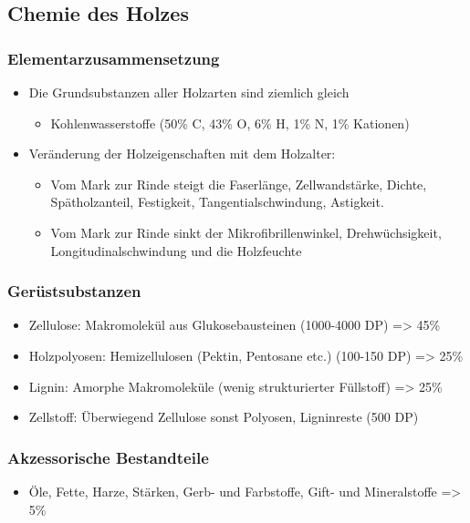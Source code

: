 \documentclass{article}
\begin{document}
\subsection{Chemie des Holzes}
\subsubsection{Elementarzusammensetzung}
\begin{itemize}
  \item Die Grundsubstanzen aller Holzarten sind ziemlich gleich 
  \begin{itemize}
    \item Kohlenwasserstoffe (50\% C, 43\% O, 6\% H, 1\% N, 1\% Kationen)
  \end{itemize}
  \item Veränderung der Holzeigenschaften mit dem Holzalter:
  \begin{itemize}
    \item Vom Mark zur Rinde steigt die Faserlänge, Zellwandstärke, 
    Dichte, Spätholzanteil, Festigkeit, Tangentialschwindung, 
    Astigkeit.
    \item Vom Mark zur Rinde sinkt der Mikrofibrillenwinkel, 
    Drehwüchsigkeit, Longitudinalschwindung und die Holzfeuchte
    \end{itemize}
\end{itemize}



\subsubsection{Gerüstsubstanzen}
\begin{itemize}
  \item Zellulose: Makromolekül aus Glukosebausteinen (1000-4000 DP) => 45\%
  \item Holzpolyosen: Hemizellulosen (Pektin, Pentosane etc.) (100-150 DP) =>
  25\%
  \item Lignin: Amorphe Makromoleküle (wenig strukturierter Füllstoff) => 25\%
  \item Zellstoff: Überwiegend Zellulose sonst Polyosen, Ligninreste (500 DP)

\end{itemize}




\subsubsection{Akzessorische Bestandteile}
\begin{itemize}
  \item Öle, Fette, Harze, Stärken, Gerb- und Farbstoffe, Gift- und
  Mineralstoffe => 5\%
\end{itemize}
\end{document}
